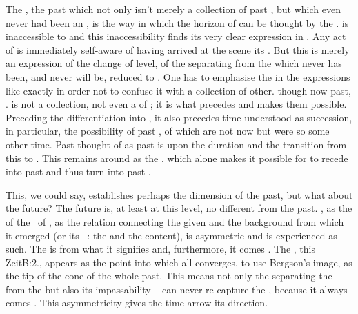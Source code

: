 \pa The , the past which not only isn't merely a collection of
past , but which even never had been an , is the
way in which the horizon of  can be thought by the .  is inaccessible to 
and this inaccessibility finds its very clear expression in . Any act
of  is immediately self-aware of having arrived at the
scene  its . But this  is merely an expression of
the change of level, of the  separating  from the
 which never has been, and never will be, reduced to
. One has to emphasise the  in the
expressions like  exactly in order not to confuse it with a
collection of other. though now past, .  is not a
collection, not 
even a  of ; it is what precedes 
and makes them possible. Preceding the differentiation into , it
also precedes time understood as succession, in particular, the possibility of
past , of  which are not  now but
were so some other time.  Past thought of as past  is 
upon the  duration and the transition from this  to
. This  remains around  as the
, which alone makes it possible for  to
recede into past and thus turn into past . 

\pa\label{pa:afterIsBefore}
This, we could say, establishes perhaps the dimension of the past, but what
about the future? The future is, at least at this level, no different from the
past. , as the  of the  \nexus\ of
, as the relation connecting the  given 
and the background from which it emerged (or its \equi\ : the
 and the  content), is asymmetric and is
experienced as such.  The  is  from what it
signifies and, furthermore, it comes .  The , this
\citet{strange crest of the time series}{Zeit}{B:2.}, appears as the
point into which all  converges, to use Bergson's image, as the
tip of the cone of the whole past.  This  means not only the
 {separating} the  from the  but
also its impassability --  can never re-capture the
, because it always comes . This asymmetricity
gives the time arrow its direction.

